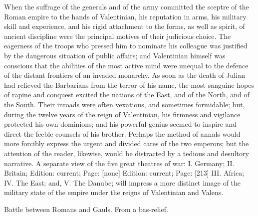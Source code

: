 When the suffrage of the generals and of the army committed the sceptre of the Roman empire to the hands of Valentinian, his reputation in arms, his military skill and experience, and his rigid attachment to the forms, as well as spirit, of ancient discipline were the principal motives of their judicious choice. The eagerness of the troops who pressed him to nominate his colleague was justified by the dangerous situation of public affairs; and Valentinian himself was conscious that the abilities of the most active mind were unequal to the defence of the distant frontiers of an invaded monarchy. As soon as the death of Julian had relieved the Barbarians from the terror of his name, the most sanguine hopes of rapine and conquest excited the nations of the East, and of the North, and of the South. Their inroads were often vexatious, and sometimes formidable; but, during the twelve years of the reign of Valentinian, his firmness and vigilance protected his own dominions; and his powerful genius seemed to inspire and direct the feeble counsels of his brother. Perhaps the method of annals would more forcibly express the urgent and divided cares of the two emperors; but the attention of the reader, likewise, would be distracted by a tedious and desultory narrative. A separate view of the five great theatres of war: I. Germany; II. Britain; Edition: current; Page: [none] Edition: current; Page: [213] III. Africa; IV. The East; and, V. The Danube; will impress a more distinct image of the military state of the empire under the reigns of Valentinian and Valens.

Battle between Romans and Gauls. From a bas-relief.

